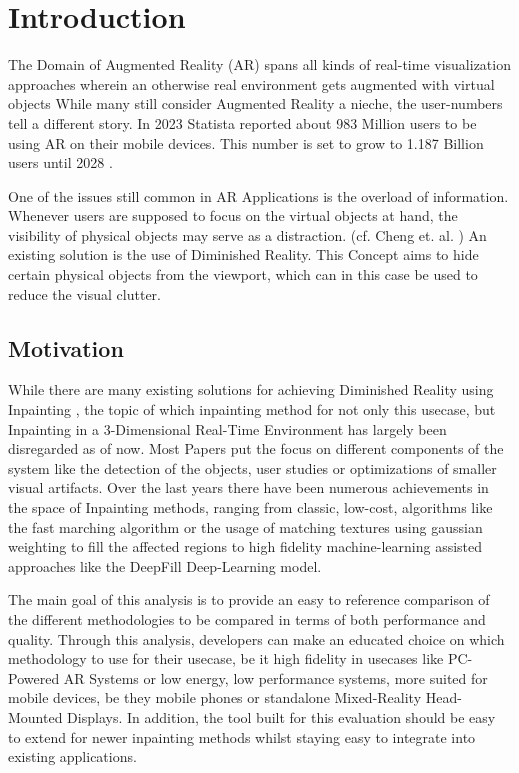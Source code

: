 \chapter{Introduction}
\label{cha:Introduction}

The Domain of Augmented Reality (AR)  spans all kinds of real-time visualization approaches wherein an otherwise real environment gets augmented with virtual objects \cite{Milgram1994}
While many still consider Augmented Reality a nieche, the user-numbers tell a different story. In 2023 Statista reported about 983 Million users to be using AR on their mobile devices. This number is set to grow to 1.187 Billion users until 2028 \cite{Statista2024}.

One of the issues still common in AR Applications is the overload of information. Whenever users are supposed to focus on the virtual objects at hand, the visibility of physical objects may serve as a distraction. (cf. Cheng et. al. \cite{ChengYiFei2022TUDR})
An existing solution is the use of Diminished Reality. This Concept aims to hide certain physical objects from the viewport, which can in this case be used to reduce the visual clutter.

\section{Motivation}

While there are many existing solutions for achieving Diminished Reality using Inpainting , the topic of which inpainting method for not only this usecase, but Inpainting in a 3-Dimensional Real-Time Environment has largely been disregarded as of now. Most Papers put the focus on different components of the system like the detection of the objects, user studies or optimizations of smaller visual artifacts.
Over the last years there have been numerous achievements in the space of Inpainting methods, ranging from classic, low-cost, algorithms like the fast marching algorithm \cite{Weiwei2021} or the usage of matching textures using gaussian weighting to fill the affected regions \cite{DingRam2019} to high fidelity machine-learning assisted approaches like the DeepFill Deep-Learning model.\cite{MuziHao2023}

The main goal of this analysis is to provide an easy to reference comparison of the different methodologies to be compared in terms of both performance and quality. Through this analysis, developers can make an educated choice on which methodology to use for their usecase, be it high fidelity in usecases like PC-Powered AR Systems or low energy, low performance systems, more suited for mobile devices, be they mobile phones or standalone Mixed-Reality Head-Mounted Displays.
In addition, the tool built for this evaluation should be easy to extend for newer inpainting methods whilst staying easy to integrate into existing applications.

